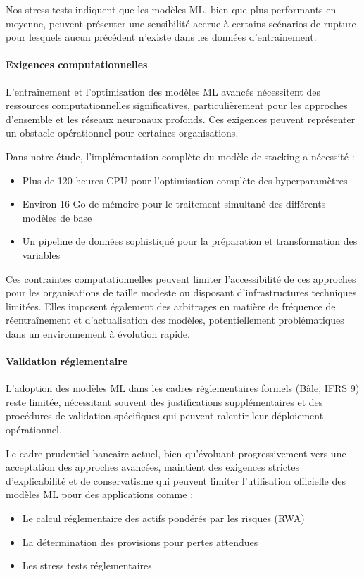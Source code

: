 Nos stress tests indiquent que les modèles ML, bien que plus performants en moyenne, peuvent présenter une sensibilité accrue à certains scénarios de rupture pour lesquels aucun précédent n'existe dans les données d'entraînement.

\paragraph{Exigences computationnelles}

L'entraînement et l'optimisation des modèles ML avancés nécessitent des ressources computationnelles significatives, particulièrement pour les approches d'ensemble et les réseaux neuronaux profonds. Ces exigences peuvent représenter un obstacle opérationnel pour certaines organisations.

Dans notre étude, l'implémentation complète du modèle de stacking a nécessité :
\begin{itemize}
    \item Plus de 120 heures-CPU pour l'optimisation complète des hyperparamètres
    \item Environ 16 Go de mémoire pour le traitement simultané des différents modèles de base
    \item Un pipeline de données sophistiqué pour la préparation et transformation des variables
\end{itemize}

Ces contraintes computationnelles peuvent limiter l'accessibilité de ces approches pour les organisations de taille modeste ou disposant d'infrastructures techniques limitées. Elles imposent également des arbitrages en matière de fréquence de réentraînement et d'actualisation des modèles, potentiellement problématiques dans un environnement à évolution rapide.

\paragraph{Validation réglementaire}

L'adoption des modèles ML dans les cadres réglementaires formels (Bâle, IFRS 9) reste limitée, nécessitant souvent des justifications supplémentaires et des procédures de validation spécifiques qui peuvent ralentir leur déploiement opérationnel.

Le cadre prudentiel bancaire actuel, bien qu'évoluant progressivement vers une acceptation des approches avancées, maintient des exigences strictes d'explicabilité et de conservatisme qui peuvent limiter l'utilisation officielle des modèles ML pour des applications comme :
\begin{itemize}
    \item Le calcul réglementaire des actifs pondérés par les risques (RWA)
    \item La détermination des provisions pour pertes attendues
    \item Les stress tests réglementaires
\end{itemize}

